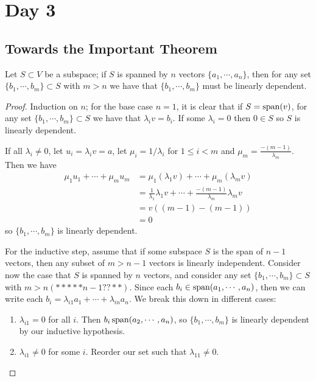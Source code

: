 
\pagebreak
\section{Day 3}

\subsection{Towards the Important Theorem}
\begin{lemma}\label{lemma:dephelp}
  Let $S\subset V$ be a subspace; if $S$ is spanned by $n$ vectors $\{a_1, \cdots, a_n\}$, then for any set $\{b_1,\cdots,b_m\}\subset S$ with $m>n$ we have that $\{b_1,\cdots,b_m\}$ must be linearly dependent.
\end{lemma}
\begin{proof}
  Induction on $n$; for the base case $n=1$, it is clear that if $S=\operatorname{span}(v)$, for any set $\{b_1,\cdots,b_m\}\subset S$ we have that $\lambda_i v = b_i$. If some $\lambda_i = 0$ then $0\in S$ so $S$ is linearly dependent.

  If all $\lambda_i\neq 0$, let $u_i = \lambda_i v=a$, let $\mu_i = 1/\lambda_i$ for $1\leq i< m$ and $\mu_m = \frac{-(m-1)}{\lambda_m}$. Then we have
  \begin{align*}
    \mu_1 u_1 + \cdots + \mu_m u_m &= \mu_1 (\lambda_1 v) + \cdots + \mu_m (\lambda_m v)\\
      &= \frac{1}{\lambda_1}\lambda_1 v + \cdots + \frac{-(m-1)}{\lambda_m} \lambda_m v\\
      &= v((m-1)-(m-1))\\
      &= 0
  \end{align*}
  so $\{b_1,\cdots,b_m\}$ is linearly dependent.

  For the inductive step, assume that if some subspace $S$ is the span of $n-1$ vectors, then any subset of $m>n-1$ vectors is linearly independent. Consider now the case that $S$ is spanned by $n$ vectors, and consider any set $\{b_1,\cdots,b_m\}\subset S$ with $m>n(*****n-1??**)$. Since each $b_i\in\operatorname{span}(a_1,\cdots,a_n)$, then we can write each $b_i=\lambda_{i1} a_1 + \cdots + \lambda_{in} a_n$. We break this down in different cases:
  \begin{enumerate}[{Case} 1)]
    \item $\lambda_{i1} =0$ for all $i$. Then $b_i\operatorname{span}(a_2,\cdots,a_n)$, so $\{b_1,\cdots,b_m\}$ is linearly dependent by our inductive hypothesis.
    \item $\lambda_{i1} \neq 0$ for some $i$. Reorder our set such that $\lambda_{11}\neq 0$.


\end{enumerate}
\end{proof}
